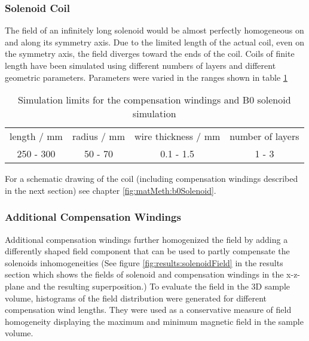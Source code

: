         \subsubsection{Solenoid Coil}
        The field of an infinitely long solenoid would be almost perfectly homogeneous on and along its symmetry axis. Due to the limited length of the actual coil, even on the symmetry axis, the field diverges toward the ends of the coil. Coils of finite length have been simulated using different numbers of layers and different geometric parameters. Parameters were varied in the ranges shown in table \ref{table:simulations:solenoidParameters}
        \begin{table} 
            \centering
            \begin{tabular}{|c|c|c|c|}
                \hline
                length / mm & radius / mm & wire thickness / mm & number of layers \\
                250 - 300 & 50 - 70 & 0.1 - 1.5 & 1 - 3\\
                \hline
            \end{tabular}
            \caption[Solenoid limits]{Simulation limits for the compensation windings and B0 solenoid simulation}
            \label{table:simulations:solenoidParameters}
        \end{table}
        For a schematic drawing of the coil (including compensation windings described in the next section) see chapter \ref{fig:matMeth:b0Solenoid}.

        \subsubsection{Additional Compensation Windings}
        Additional compensation windings further homogenized the field by adding a differently shaped field component that can be used to partly compensate the solenoids inhomogeneities (See figure \ref{fig:results:solenoidField} in the results section which shows the fields of solenoid and compensation windings in the x-z-plane and the resulting superposition.)
        To evaluate the field in the 3D sample volume, histograms of the field distribution were generated for different compensation wind lengths. They were used as a conservative measure of field homogeneity displaying the maximum and minimum magnetic field in the sample volume.
